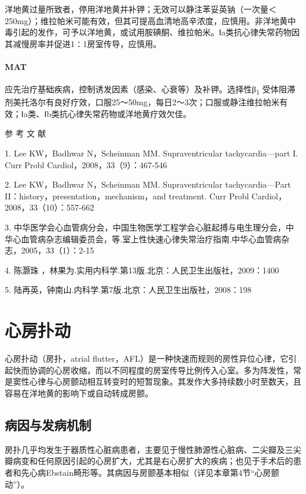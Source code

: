 洋地黄过量所致者，停用洋地黄并补钾；无效可以静注苯妥英钠（一次量＜
250mg）；维拉帕米可能有效，但其可提高血清地高辛浓度，应慎用。非洋地黄中毒引起的发作，可予以洋地黄，或试用胺碘酮、维拉帕米。Ⅰa类抗心律失常药物因其减慢房率并促进1∶1房室传导，应慎用。

\paragraph{MAT}

应先治疗基础疾病，控制诱发因素（感染、心衰等）及补钾。选择性β\textsubscript{1}
受体阻滞剂美托洛尔有良好疗效，口服25～50mg，每日2～3次；口服或静注维拉帕米有效；Ⅰa类、Ⅰb类抗心律失常药物或洋地黄疗效欠佳。

\hypertarget{text00289.htmlux5cux23CHP10-2-2-4}{}
参 考 文 献

1. Lee KW，Badhwar N，Scheinman MM. Supraventricular tachycardia---part
I. Curr Probl Cardiol，2008，33（9）：467-546

2. Lee KW，Badhwar N，Scheinman MM. Supraventricular tachycardia---Part
II：history，presentation，mechanism，and treatment. Curr Probl
Cardiol，2008，33（10）：557-662

3.
中华医学会心血管病分会，中国生物医学工程学会心脏起搏与电生理分会，中华心血管病杂志编辑委员会，等.室上性快速心律失常治疗指南.中华心血管病杂志，2005，33（1）：2-15

4. 陈灏珠 ，林果为.实用内科学.第13版.北京：人民卫生出版社，2009：1400

5. 陆再英，钟南山.内科学.第7版.北京：人民卫生出版社，2008：198

\protect\hypertarget{text00290.html}{}{}

\section{心房扑动}

心房扑动（房扑，atrial
flutter，AFL）是一种快速而规则的房性异位心律，它引起快而协调的心房收缩，而以不同程度的房室传导比例传入心室。多为阵发性，常是窦性心律与心房颤动相互转变时的短暂现象。其发作大多持续数小时至数天，且容易在洋地黄的影响下或自动转成房颤。

\subsection{病因与发病机制}

房扑几乎均发生于器质性心脏病患者，主要见于慢性肺源性心脏病、二尖瓣及三尖瓣病变和任何原因引起的心房扩大，尤其是右心房扩大的疾病；也见于手术后的患者和先心病Ebstain畸形等。其病因与房颤基本相似（详见本章第4节“心房颤动”）。

